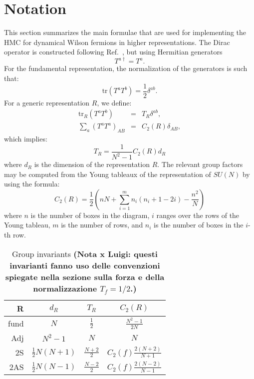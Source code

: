 \documentclass{article}[12pt]
\begin{document}
\section{Notation}
This section summarizes the main formulae that are used for
implementing the HMC for dynamical Wilson fermions in higher
representations. The Dirac operator is constructed following 
Ref.~\cite{Luscher:1996sc}, but using Hermitian generators 
%
\begin{equation}
T^{a\dagger}=T^a.
\end{equation}
%
For the fundamental representation, the normalization of the
generators is such that:
%
\begin{equation}
\mathrm{tr } \left(T^a T^b \right) = \frac12 \delta^{ab}.
\end{equation}
%
For a generic representation $R$, we define:
%
\begin{eqnarray}
\mathrm{tr }_R \left(T^a T^b \right) &=& T_R \delta^{ab}, \\
\sum_a \left(T^a T^a \right)_{AB} &=& C_2(R) \delta_{AB},
\end{eqnarray}
%
which implies: 
%
\begin{equation}
T_R = \frac{1}{N^2-1} C_2(R) d_R
\end{equation}
%
where $d_R$ is the dimension of the representation $R$.
The relevant group factors may be computed from the Young tableaux of the
representation of $SU(N)$ by using the formula:
%
\begin{equation}
C_2(R) =\frac{1}{2}\left(nN+ \sum_{i=1}^{m} n_i \left( n_i+1-2i
\right) - \frac{n^2}{N}\right)
\end{equation}
%
where $n$ is the number of boxes in the diagram, $i$ ranges over the
rows of the Young tableau, $m$ is the number of rows, and $n_i$ is the
number of boxes in the $i$-th row. 

\begin{table}[htp]
\begin{center}
\caption{Group invariants \textbf{(Nota x Luigi: questi invarianti fanno uso delle 
		convenzioni spiegate nella sezione sulla forza e della normalizzazione $T_f=1/2$.)}}
\label{table1}
\begin{tabular}{r|c|c|c}
R    & $d_R$               & $T_R$           & $C_2(R)$            \\
\hline
fund & $N$                 & $\frac12$       & $\frac{N^2-1}{2 N}$ \\        
Adj  & $N^2-1$             & $N$             & $N$ \\
2S   & $\frac{1}{2}N(N+1)$ & $\frac{N+2}{2}$ & $C_2(f) \frac{2(N+2)}{N+1}$ \\
2AS  & $\frac{1}{2}N(N-1)$ & $\frac{N-2}{2}$ & $C_2(f)
\frac{2(N-2)}{N-1}$ \\
\hline
\end{tabular}
\end{center}
\end{table}
\end{document}
